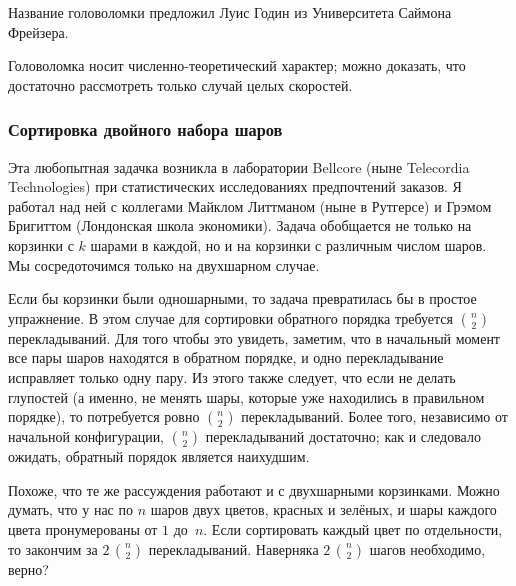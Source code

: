 \documentclass[twoside]{book}
\begin{document}
\medskip

Название головоломки предложил Луис Годин из Университета Саймона Фрейзера.

Головоломка носит численно-теоретический характер;
можно доказать, что достаточно рассмотреть только случай целых скоростей.

\subsubsection*{Сортировка двойного набора шаров}

Эта любопытная задачка возникла в лаборатории Bellcore (ныне Telecordia Technologies) при статистических исследованиях предпочтений заказов.
Я работал над ней с коллегами Майклом Литтманом (ныне в Рутгерсе) и Грэмом Бригиттом (Лондонская школа экономики).
Задача обобщается не только на  корзинки с $k$ шарами в каждой, но и на корзинки с различным числом шаров.
Мы сосредоточимся только на двухшарном случае.

\medskip

Если бы корзинки были одношарными, то задача превратилась бы в простое упражнение.
В этом случае для сортировки обратного порядка требуется $\binom{n}{2}$ перекладываний.
Для того чтобы это увидеть, заметим, что в начальный момент все пары шаров находятся в обратном порядке, и одно перекладывание исправляет только одну пару.
Из этого также следует, что если не делать глупостей (а именно, не менять шары, которые уже находились в правильном порядке), то потребуется ровно $\binom{n}{2}$ перекладываний.
Более того, независимо от начальной конфигурации, $\binom{n}{2}$ перекладываний достаточно; как и следовало ожидать, обратный порядок является наихудшим.

\medskip

Похоже, что те же рассуждения работают и с двухшарными корзинками.
Можно думать, что у нас по $n$ шаров двух цветов, красных и зелёных, и шары каждого цвета пронумерованы от $1$ до~$n$.
Если сортировать каждый цвет по отдельности, то закончим за $2\,\binom{n}{2}$ перекладываний.
Наверняка $2\,\binom{n}{2}$ шагов необходимо, верно?
\end{document}
